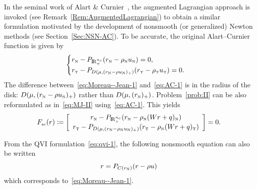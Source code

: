 { In the seminal work of  Alart \& Curnier~\cite{Curnier.Alart88,Alart.Curnier1991}, the augmented Lagrangian approach is invoked (see Remark~\ref{Rem:AugmentedLagrangian}) to obtain a  similar formulation motivated by the development of nonsmooth (or generalized) Newton methods (see Section~\ref{Sec:NSN-AC}). To be accurate, the original Alart--Curnier function is given by 
\begin{equation}
  \label{eq:AC-1}
  \begin{cases}
    r_\n - P_{\RR^{n_c}_+}(r_\n - \rho_\n  u_\n) = 0, \\
    r_\t - P_{D(\mu, (r_\n - \rho u_\n)_+)}(r_\t - \rho_\t u_\t   )=0.
  \end{cases}
\end{equation}
The difference between~\eqref{eq:Moreau--Jean-1} and~\eqref{eq:AC-1} is in the radius of the disk: $D(\mu, (r_{\hbox{\tiny{N}}} - \rho u_{\hbox{\tiny{N}}})_+)$ rather than $D(\mu, (r_{{\hbox{\tiny{N}}}})_+)$.
Problem~\ref{prob:II} can be also reformulated as in~\eqref{eq:MJ-II} using~\eqref{eq:AC-1}.
This yields
\begin{equation}
  \label{eq:AC-II}
    F_{\actwo}(r) \coloneqq \left[ \begin{array}{c}
    r_\n - P_{\RR^{n_c}_+}(r_\n - \rho_\n (W r +  q)_\n) \\
    r_\t - P_{D(\mu, (r_\n - \rho_\n u_\n)_+)}(r_\t - \rho_\n (W r +  q)_\t   )
  \end{array}\right] =0.
\end{equation}

\begin{remark}
  From the QVI formulation~\eqref{eq:qvi-1}, the following nonsmooth
  equation can also be written
  \begin{equation}
    \label{eq:qvi-proj}
    r = P_{C(r_\n)}(r-\rho u)
  \end{equation}
  which  corresponds to~\eqref{eq:Moreau--Jean-1}. 
\end{remark}

}
